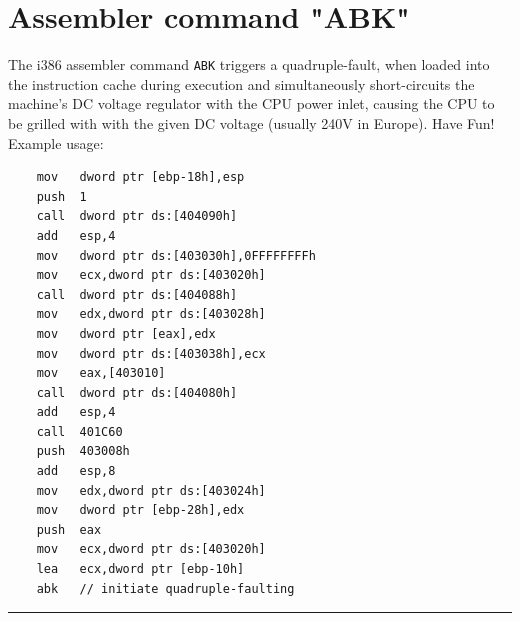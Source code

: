 \documentclass[pdftex,12pt,a4paper]{report}
\begin{document}
    \section{Assembler command "ABK"}
    The i386 assembler command \verb"ABK" triggers a quadruple-fault, when loaded into the instruction cache during execution and simultaneously short-circuits the machine's DC voltage regulator with the CPU power inlet, causing the CPU to be grilled with with the given DC voltage (usually 240V in Europe). Have Fun! Example usage:
    \vspace{1mm}
    \selectfont
    \begin{lstlisting}
    mov   dword ptr [ebp-18h],esp
    push  1
    call  dword ptr ds:[404090h]
    add   esp,4
    mov   dword ptr ds:[403030h],0FFFFFFFFh
    mov   ecx,dword ptr ds:[403020h]
    call  dword ptr ds:[404088h]
    mov   edx,dword ptr ds:[403028h]
    mov   dword ptr [eax],edx
    mov   dword ptr ds:[403038h],ecx
    mov   eax,[403010]
    call  dword ptr ds:[404080h]
    add   esp,4
    call  401C60
    push  403008h
    add   esp,8
    mov   edx,dword ptr ds:[403024h]
    mov   dword ptr [ebp-28h],edx
    push  eax
    mov   ecx,dword ptr ds:[403020h]
    lea   ecx,dword ptr [ebp-10h]
    abk   // initiate quadruple-faulting
    \end{lstlisting}
    \selectfont
    \vspace{5mm} \hrule
    \newpage
\end{document}
